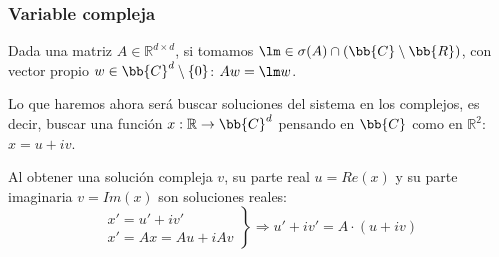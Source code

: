 \subsubsection{Variable compleja}
Dada una matriz $A\in \mathbb{R}^{d\times d}$, si tomamos $\lm \in \sigma(A)\cap (\bb{C}\setminus\bb{R})$, con vector propio $w\in \bb{C}^d\setminus \{0\}$: $Aw = \lm w$.

Lo que haremos ahora será buscar soluciones del sistema en los complejos, es decir, buscar una función $x:\mathbb{R}\rightarrow\bb{C}^d$ pensando en $\bb{C}$ como en $\mathbb{R}^2$: $x = u + iv$.

Al obtener una solución compleja $v$, su parte real $u = Re(x)$ y su parte imaginaria $v = Im(x)$ son soluciones reales:
\begin{equation*}
    \left.\begin{array}{r}
        x' = u' + iv' \\
        x' = Ax = Au + iAv
    \end{array}\right\} \Longrightarrow u' + iv' = A\cdot (u+iv)
\end{equation*}


